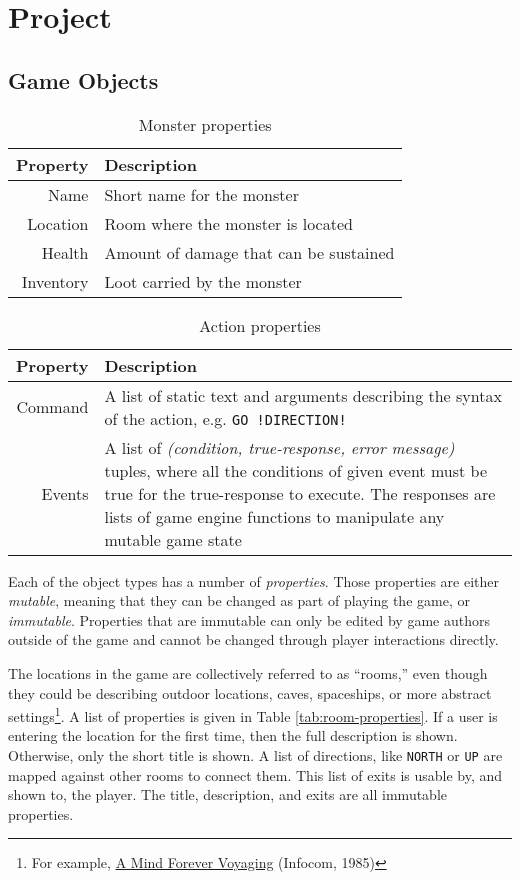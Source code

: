 \documentclass{article}
\newcommand{\enterProblemHeader}[1]{
}
\newcommand{\exitProblemHeader}[1]{
\nobreak\extramarks{#1}{}\nobreak
}
\newcounter{homeworkProblemCounter} %
\newcommand{\homeworkProblemName}{}
\newenvironment{homeworkProblem}[1][Problem \arabic{homeworkProblemCounter}]{ %
\stepcounter{homeworkProblemCounter} %
\renewcommand{\homeworkProblemName}{#1} %
\section{\homeworkProblemName} %
\enterProblemHeader{\homeworkProblemName} %
}{
\exitProblemHeader{\homeworkProblemName} %
}
\newcommand{\homeworkSectionName}{}
\newenvironment{homeworkSection}[1]{ %
\renewcommand{\homeworkSectionName}{#1} %
\subsection{\homeworkSectionName} %
\enterProblemHeader{\homeworkProblemName\ [\homeworkSectionName]} %
}{
\enterProblemHeader{\homeworkProblemName} %
}
\begin{document}
\begin{homeworkProblem}[Project]
\begin{homeworkSection}{Game Objects}
\begin{table}
	\begin{tabularx}{\textwidth}{|r|X|}
		\hline
		Property & Description \\
		\hline \hline
		Name & Short name for the monster \\
		Location & Room where the monster is located \\
		Health & Amount of damage that can be sustained \\
		Inventory & Loot carried by the monster \\
		\hline
	\end{tabularx}
	\caption{Monster properties}
	\label{tab:monster-properties}
\end{table}

\begin{table}
	\begin{tabularx}{\textwidth}{|r|X|}
		\hline
		Property & Description \\
		\hline \hline
		Command & A list of static text and arguments describing the syntax of the action, e.g. \texttt{GO !DIRECTION!} \\
		Events & A list of \textit{(condition, true-response, error message)} tuples, where all the conditions of given event must be true for the true-response to execute. The responses are lists of game engine functions to manipulate any mutable game state \\
		\hline
	\end{tabularx}
	\caption{Action properties}
	\label{tab:action-properties}
\end{table}

	Each of the object types has a number of \textit{properties}. Those properties are either \textit{mutable}, meaning that they can be changed as part of playing the game, or \textit{immutable}. Properties that are immutable can only be edited by game authors outside of the game and cannot be changed through player interactions directly.

	The locations in the game are collectively referred to as ``rooms,'' even though they could be describing outdoor locations, caves, spaceships, or more abstract settings\footnote{For example, \href{https://en.wikipedia.org/wiki/A_Mind_Forever_Voyaging}{A Mind Forever Voyaging} (Infocom, 1985)}. A list of properties is given in Table \ref{tab:room-properties}. If a user is entering the location for the first time, then the full description is shown. Otherwise, only the short title is shown. A list of directions, like \texttt{NORTH} or \texttt{UP} are mapped against other rooms to connect them. This list of exits is usable by, and shown to, the player. The title, description, and exits are all immutable properties.


\end{homeworkSection}
\end{homeworkProblem}
\end{document}
